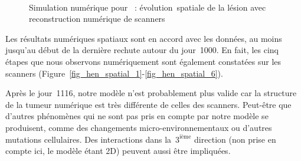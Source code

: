 \documentclass[main.tex]{subfiles}
\begin{document}
\begin{figure}[t]
\\
\caption{Simulation numérique pour \Nber~: évolution\protect\footnotemark~spatiale de la lésion avec reconstruction numérique de scanners} \label{fig:simu_henbert_scan}
\end{figure}


Les résultats numériques spatiaux sont en accord avec les données, au moins jusqu'au début de la dernière rechute autour du jour~1000. En fait, les cinq étapes que nous observons numériquement sont également constatées sur les scanners (\cf Figure~\ref{fig_hen_spatial_1}-\ref{fig_hen_spatial_6}).


Après le jour~1116, notre modèle n'est probablement plus valide car la structure de la tumeur numérique est très différente de celles des scanners. Peut-être que d'autres phénomènes qui ne sont pas pris en compte par notre modèle se produisent, comme des changements micro-environnementaux ou d'autres mutations cellulaires. Des interactions dans la~$3^\textrm{ième}$ direction (non prise en compte ici, le modèle étant 2D) peuvent aussi être impliquées.

\end{document}
